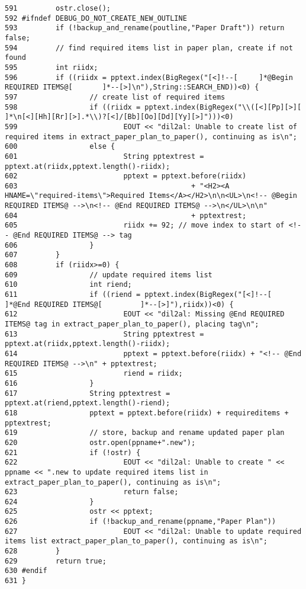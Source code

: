 \begin{verbatim}
591         ostr.close();
592 #ifndef DEBUG_DO_NOT_CREATE_NEW_OUTLINE
593         if (!backup_and_rename(poutline,"Paper Draft")) return false;
594         // find required items list in paper plan, create if not found
595         int riidx;
596         if ((riidx = pptext.index(BigRegex("[<]!--[     ]*@Begin REQUIRED ITEMS@[       ]*--[>]\n"),String::SEARCH_END))<0) {
597                 // create list of required items
598                 if ((riidx = pptext.index(BigRegex("\\([<][Pp][>][      ]*\n[<][Hh][Rr][>].*\\)?[<]/[Bb][Oo][Dd][Yy][>]")))<0)
599                         EOUT << "dil2al: Unable to create list of required items in extract_paper_plan_to_paper(), continuing as is\n";
600                 else {
601                         String pptextrest = pptext.at(riidx,pptext.length()-riidx);
602                         pptext = pptext.before(riidx)
603                                         + "<H2><A HNAME=\"required-items\">Required Items</A></H2>\n\n<UL>\n<!-- @Begin REQUIRED ITEMS@ -->\n<!-- @End REQUIRED ITEMS@ -->\n</UL>\n\n"
604                                         + pptextrest;
605                         riidx += 92; // move index to start of <!-- @End REQUIRED ITEMS@ --> tag
606                 }
607         }
608         if (riidx>=0) {
609                 // update required items list
610                 int riend;
611                 if ((riend = pptext.index(BigRegex("[<]!--[     ]*@End REQUIRED ITEMS@[         ]*--[>]"),riidx))<0) {
612                         EOUT << "dil2al: Missing @End REQUIRED ITEMS@ tag in extract_paper_plan_to_paper(), placing tag\n";
613                         String pptextrest = pptext.at(riidx,pptext.length()-riidx);
614                         pptext = pptext.before(riidx) + "<!-- @End REQUIRED ITEMS@ -->\n" + pptextrest;
615                         riend = riidx;
616                 }
617                 String pptextrest = pptext.at(riend,pptext.length()-riend);
618                 pptext = pptext.before(riidx) + requireditems + pptextrest;
619                 // store, backup and rename updated paper plan
620                 ostr.open(ppname+".new");
621                 if (!ostr) {
622                         EOUT << "dil2al: Unable to create " << ppname << ".new to update required items list in extract_paper_plan_to_paper(), continuing as is\n";
623                         return false;
624                 }
625                 ostr << pptext;
626                 if (!backup_and_rename(ppname,"Paper Plan"))
627                         EOUT << "dil2al: Unable to update required items list extract_paper_plan_to_paper(), continuing as is\n";
628         }
629         return true;
630 #endif
631 }
\end{verbatim}\normalsize 
{}
